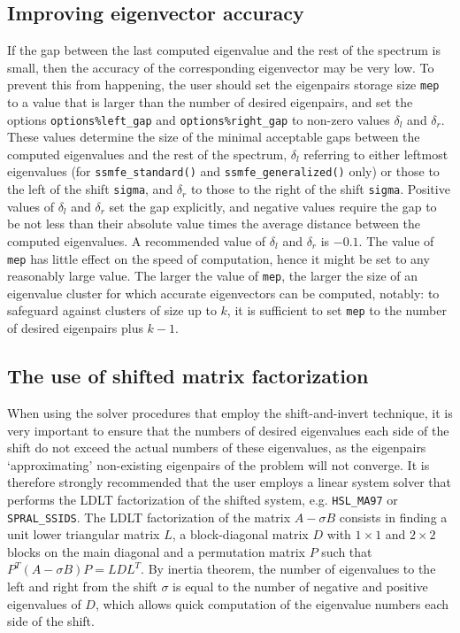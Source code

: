 \subsection{Improving eigenvector accuracy}

If the gap %
between the last computed eigenvalue 
and the rest of the spectrum is small,
then the accuracy of the corresponding eigenvector may be very low.
To prevent this from happening,
the user should set the eigenpairs storage size {\tt mep}
to a value that is larger than the number of desired eigenpairs,
and set the options 
{\tt options\%left\_gap}
and
{\tt options\%right\_gap}
to non-zero values $\delta_l$ and $\delta_r$.
These values
determine the size of the minimal acceptable gaps
between the computed eigenvalues and the rest of the spectrum,
$\delta_l$ referring to either leftmost eigenvalues
(for {\tt ssmfe\_standard()} and {\tt ssmfe\_generalized()} only)
or those to the left of the shift {\tt sigma},
and $\delta_r$
to those to the right of the shift {\tt sigma}.
Positive values of $\delta_l$ and $\delta_r$
set the gap explicitly,
and negative values
require the gap to be not less than their absolute value times
the average distance between the computed eigenvalues.
A recommended value of $\delta_l$ and $\delta_r$ is $-0.1$.
The value of {\tt mep} %
has little effect on
the speed of computation,
hence it might be set to any reasonably large value.
The larger the value of {\tt mep}, 
the larger the size of an eigenvalue cluster
for which accurate eigenvectors can be computed, notably:
to safeguard against clusters of size up to $k$,
it is sufficient to set {\tt mep} to the number of desired eigenpairs
plus $k - 1$.

\subsection{The use of shifted matrix factorization}
\label{sec:si}

When using the solver procedures that employ the shift-and-invert technique,
it is very important to ensure that the numbers of desired eigenvalues
each side of the shift do not exceed the actual numbers of these eigenvalues,
as the eigenpairs `approximating' non-existing eigenpairs of the problem
will not converge.
It is therefore strongly recommended that the user employs 
a linear system solver that performs
the LDLT
factorization of %
the shifted system,
e.g. {\tt HSL\_MA97} or {\tt SPRAL\_SSIDS}.
The LDLT factorization of the matrix
$A - \sigma B$ consists in finding a unit lower triangular
matrix $L$, a block-diagonal matrix $D$
with $1\times 1$ and $2\times 2$ blocks on the main diagonal
and a permutation matrix $P$
such that $P^T(A - \sigma B)P = L D L^T$.
By inertia theorem,
the number of eigenvalues to the left and right from 
the shift $\sigma$
is equal to the number of negative and positive eigenvalues of $D$,
which allows quick computation of the eigenvalue numbers
each side of the shift. %

